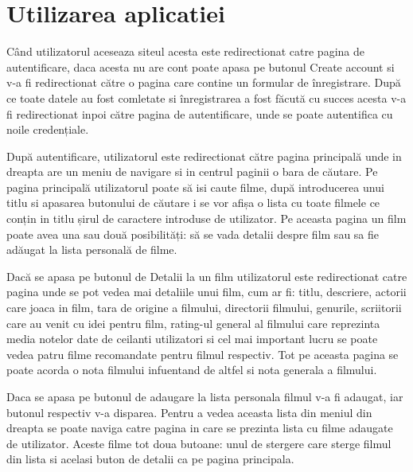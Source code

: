 \section{Utilizarea aplicatiei}
\label{sec:ch3sec2}
\par Când utilizatorul aceseaza siteul acesta este redirectionat catre pagina de autentificare, daca acesta nu are cont poate apasa pe butonul Create account si v-a fi redirectionat către o pagina care contine un formular de înregistrare. După ce toate datele au fost comletate si înregistrarea a fost făcută cu succes acesta v-a fi redirectionat inpoi către pagina de autentificare, unde se poate autentifica cu noile credențiale.
\par După autentificare, utilizatorul este redirectionat către pagina principală unde in dreapta are un meniu de navigare si in centrul paginii o bara de căutare. Pe pagina principală utilizatorul poate să isi caute filme, după introducerea unui titlu si apasarea butonului de căutare i se vor afișa o lista cu toate filmele ce conțin in titlu șirul de caractere introduse de utilizator. Pe aceasta pagina un film poate avea una sau două posibilități: să se vada detalii despre film sau sa fie adăugat la lista personală de filme.
\par Dacă se apasa pe butonul de Detalii la un film utilizatorul este redirectionat catre pagina unde se pot vedea mai detaliile unui film, cum ar fi: titlu, descriere, actorii care joaca in film, tara de origine a filmului, directorii filmului, genurile, scriitorii care au venit cu idei pentru film, rating-ul general al filmului care reprezinta media notelor date de ceilanti utilizatori si cel mai important lucru se poate vedea patru filme recomandate pentru filmul respectiv. Tot pe aceasta pagina se poate acorda o nota filmului infuentand de altfel si nota generala a filmului.
\par Daca se apasa pe butonul de adaugare la lista personala filmul v-a fi adaugat, iar butonul respectiv v-a disparea. Pentru a vedea aceasta lista din meniul din dreapta se poate naviga catre pagina in care se prezinta lista cu filme adaugate de utilizator. Aceste filme tot doua butoane: unul de stergere care sterge filmul din lista si acelasi buton de detalii ca pe pagina principala.

